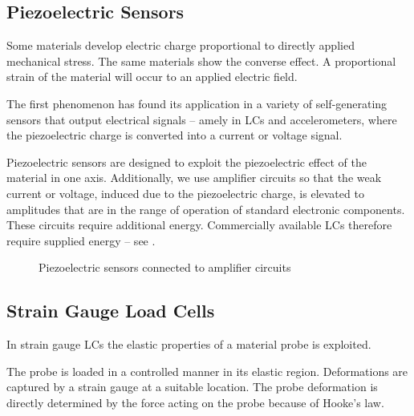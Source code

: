 \subsection{Piezoelectric Sensors}
Some materials develop electric charge proportional to directly applied mechanical stress. The same materials show the converse effect. A proportional strain of the material will occur to an applied electric field.

The first phenomenon has found its application in a variety of self-generating sensors that output electrical signals -- amely in \ac{LC}s and accelerometers, where the piezoelectric charge is converted into a current or voltage signal.

Piezoelectric sensors are designed to exploit the piezoelectric effect of the material in one axis. Additionally, we use amplifier circuits so that the weak current or voltage, induced due to the piezoelectric charge, is elevated to amplitudes that are in the range of operation of standard electronic components. These circuits require additional energy. Commercially available \ac{LC}s therefore require supplied energy -- see .

\begin{figure}[!htb]
    \centering
    \hspace{4em}
    \caption[Piezoelectric sensors in amplifier circuits \cite{webster2018measurement}]{Piezoelectric sensors connected to amplifier circuits \cite{webster2018measurement}}
    \label{fig:piezo_ampcirc}
\end{figure}


\subsection{Strain Gauge Load Cells}

In strain gauge \ac{LC}s the elastic properties of a material probe is exploited.

The probe is loaded in a controlled manner in its elastic region. Deformations are captured by a strain gauge at a suitable location. The probe deformation is directly determined by the force acting on the probe because of Hooke's law.

